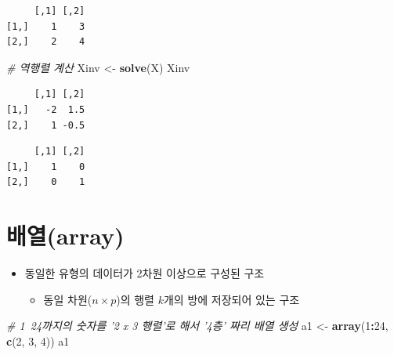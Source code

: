 \documentclass[11pt,a4paper]{book}
\newenvironment{Shaded}{\begin{snugshade}}{\end{snugshade}}
\newcommand{\KeywordTok}[1]{\textcolor[rgb]{0.13,0.29,0.53}{\textbf{#1}}}
\newcommand{\DecValTok}[1]{\textcolor[rgb]{0.00,0.00,0.81}{#1}}
\newcommand{\StringTok}[1]{\textcolor[rgb]{0.31,0.60,0.02}{#1}}
\newcommand{\CommentTok}[1]{\textcolor[rgb]{0.56,0.35,0.01}{\textit{#1}}}
\newcommand{\OperatorTok}[1]{\textcolor[rgb]{0.81,0.36,0.00}{\textbf{#1}}}
\newcommand{\NormalTok}[1]{#1}
\providecommand{\tightlist}{%
  \setlength{\itemsep}{0pt}\setlength{\parskip}{0pt}}
\theoremstyle{definition}
\theoremstyle{definition}
\theoremstyle{definition}
\theoremstyle{remark}
\begin{document}
\begin{verbatim}
     [,1] [,2]
[1,]    1    3
[2,]    2    4
\end{verbatim}

\begin{Shaded}
\begin{Highlighting}[]
\CommentTok{# 역행렬 계산}
\NormalTok{Xinv <-}\StringTok{ }\KeywordTok{solve}\NormalTok{(X)}
\NormalTok{Xinv}
\end{Highlighting}
\end{Shaded}

\begin{verbatim}
     [,1] [,2]
[1,]   -2  1.5
[2,]    1 -0.5
\end{verbatim}

\begin{Shaded}
\end{Shaded}

\begin{verbatim}
     [,1] [,2]
[1,]    1    0
[2,]    0    1
\end{verbatim}

\normalsize

\section{배열(array)}\label{array}

\begin{itemize}
\tightlist
\item
  동일한 유형의 데이터가 2차원 이상으로 구성된 구조

  \begin{itemize}
  \tightlist
  \item
    동일 차원(\(n\times p\))의 행렬 \(k\)개의 방에 저장되어 있는 구조
  \end{itemize}
\end{itemize}

\footnotesize

\begin{Shaded}
\begin{Highlighting}[]
\CommentTok{# 1~24까지의 숫자를 '2 x 3 행렬'로 해서 '4층' 짜리 배열 생성}
\NormalTok{a1 <-}\StringTok{ }\KeywordTok{array}\NormalTok{(}\DecValTok{1}\OperatorTok{:}\DecValTok{24}\NormalTok{, }\KeywordTok{c}\NormalTok{(}\DecValTok{2}\NormalTok{, }\DecValTok{3}\NormalTok{, }\DecValTok{4}\NormalTok{))}
\NormalTok{a1}
\end{Highlighting}
\end{Shaded}
\end{document}
